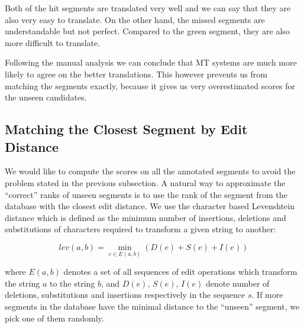 \noindent Both of the hit segments are translated very well and we can say that
they are also very easy to translate. On the other hand, the missed segments
are understandable but not perfect. Compared to the green segment, they are
also more difficult to translate.

Following the manual analysis we can conclude that MT systems are much more
likely to agree on the better translations. This however prevents us from
matching the segments exactly, because it gives us very overestimated scores
for the unseen candidates.

\subsection{Matching the Closest Segment by Edit Distance}
\label{match:editdistance}

We would like to compute the scores on all the annotated segments to avoid the
problem stated in the previous subsection. A natural way to approximate the
``correct'' ranks of unseen segments is to use the rank of the segment from the
database with the closest edit distance. We use the character based Levenshtein
distance which is defined as the minimum number of insertions, deletions and
substitutions of characters required to transform a given string to another:

\begin{equation*}
    lev(a,b) = \min_{e \in E(a,b)} \left( D(e) + S(e) + I(e) \right)
\end{equation*}

\noindent where $E(a,b)$ denotes a set of all sequences of edit operations
which transform the string $a$ to the string $b$, and $D(e)$, $S(e)$, $I(e)$
denote number of deletions, substitutions and insertions respectively in the
sequence $s$. If more segments in the database have the minimal distance to the
``unseen'' segment, we pick one of them randomly.


